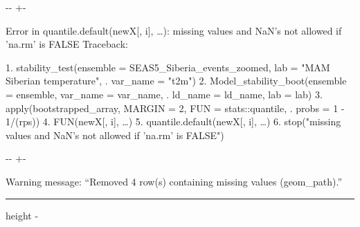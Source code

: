 \documentclass[letterpaper,10pt,english]{sphinxmanual}
\newlength\nbsphinxcodecellspacing
\begin{document}
{

\kern-\sphinxverbatimsmallskipamount\kern-\baselineskip
\kern+\FrameHeightAdjust\kern-\fboxrule
\vspace{\nbsphinxcodecellspacing}

\begin{sphinxVerbatim}[commandchars=\\\{\}]
Error in quantile.default(newX[, i], {\ldots}): missing values and NaN's not allowed if 'na.rm' is FALSE
Traceback:

1. stability\_test(ensemble = SEAS5\_Siberia\_events\_zoomed, lab = "MAM Siberian temperature",
 .     var\_name = "t2m")
2. Model\_stability\_boot(ensemble = ensemble, var\_name = var\_name,
 .     ld\_name = ld\_name, lab = lab)
3. apply(bootstrapped\_array, MARGIN = 2, FUN = stats::quantile,
 .     probs = 1 - 1/(rps))
4. FUN(newX[, i], {\ldots})
5. quantile.default(newX[, i], {\ldots})
6. stop("missing values and NaN's not allowed if 'na.rm' is FALSE")
\end{sphinxVerbatim}
}

{
\begin{sphinxVerbatim}[commandchars=\\\{\}]
\llap{\color{nbsphinxin}[8]:\,\hspace{\fboxrule}\hspace{\fboxsep}}     
\end{sphinxVerbatim}
}

{

\kern-\sphinxverbatimsmallskipamount\kern-\baselineskip
\kern+\FrameHeightAdjust\kern-\fboxrule
\vspace{\nbsphinxcodecellspacing}

\begin{sphinxVerbatim}[commandchars=\\\{\}]
Warning message:
“Removed 4 row(s) containing missing values (geom\_path).”
\end{sphinxVerbatim}
}

\hrule height -\fboxrule\relax
\vspace{\nbsphinxcodecellspacing}
\end{document}
